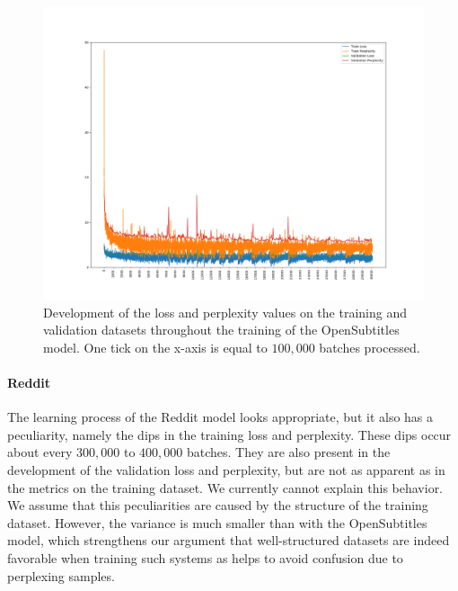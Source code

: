 \begin{figure}[H]
	\includegraphics[width=\linewidth]{img/plots/opensubtitles_not_reversed/train_metrics.png}
	\caption{Development of the loss and perplexity values on the training and validation datasets throughout the training of the OpenSubtitles model. One tick on the x-axis is equal to $100,000$ batches processed.}
	\label{results:learning_process:metrics:opensubtitles}
\end{figure}

\paragraph{Reddit} The learning process of the Reddit model looks appropriate, but it also has a peculiarity, namely the dips in the training loss and perplexity. These dips occur about every $300,000$ to $400,000$ batches. They are also present in the development of the validation loss and perplexity, but are not as apparent as in the metrics on the training dataset. We currently cannot explain this behavior. We assume that this peculiarities are caused by the structure of the training dataset. However, the variance is much smaller than with the OpenSubtitles model, which strengthens our argument that well-structured datasets are indeed favorable when training such systems as helps to avoid confusion due to perplexing samples.

